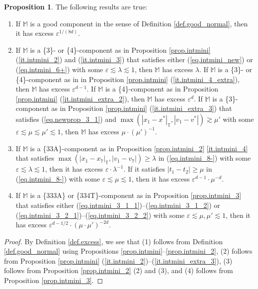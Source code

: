 \documentclass[10pt, reqno]{amsart}
\newcommand{\Mb}{\mathbb M}
\newcommand{\Tb}{\mathbb T}
\theoremstyle{definition}
\newtheorem{proposition}[theorem]{Proposition}
\theoremstyle{remark}
\numberwithin{equation}{section}
\begin{document}
\begin{proposition}
\label{prop.newprop_3} The following results are true:
\begin{enumerate}
\item\label{it.newprop_0} If $\Mb$ is a good component in the sense of Definition \ref{def.good_normal}, then it has excess $\varepsilon^{1/(8d)}$.
\item\label{it.newprop_1} If $\Mb$ is a \{3\}- or \{4\}-component as in Proposition \ref{prop.intmini} (\ref{it.intmini_2}) and (\ref{it.intmini_3}) that satisfies either (\ref{eq.intmini_new}) or (\ref{eq.intmini_6+}) with some $\varepsilon\lesssim\lambda\lesssim 1$, then $\Mb$ has excess $\lambda$. If $\Mb$ is a \{3\}- or \{4\}-component as in in Proposition \ref{prop.intmini} (\ref{it.intmini_4_extra}), then $\Mb$ has excess $\varepsilon^{d-1}$. If $\Mb$ is a \{4\}-component as in Proposition \ref{prop.intmini} (\ref{it.intmini_extra_2}), then $\Mb$ has excess $\varepsilon^{d}$. If $\Mb$ is a \{3\}-component as in Proposition \ref{prop.intmini} (\ref{it.intmini_extra_3}) that satisfies (\ref{eq.newprop_3_1}) and $\max(|x_1-x^*|_\Tb,|v_1-v^*|)\gtrsim\mu'$ with some $\varepsilon\lesssim\mu\lesssim\mu'\lesssim 1$, then $\Mb$ has excess $\mu\cdot(\mu')^{-1}$.
\item\label{it.newprop_2} If $\Mb$ is a \{33A\}-component as in Proposition \ref{prop.intmini_2} \ref{it.intmini_4} that satisfies $\max(|x_1-x_7|_\Tb,|v_1-v_7|)\geq \lambda$ in (\ref{eq.intmini_8-}) with some $\varepsilon\lesssim\lambda\lesssim 1$, then it has excess $\varepsilon\cdot\lambda^{-1}$. If it satisfies $|t_1-t_2|\geq\mu$ in (\ref{eq.intmini_8-}) with some $\varepsilon\lesssim\mu\lesssim 1$, then it has excess $\varepsilon^{d-1}\cdot\mu^{-d}$.
\item\label{it.newprop_3} If $\Mb$ is a \{333A\} or \{334T\}-component as in Proposition \ref{prop.intmini_3} that satisfies either (\ref{eq.intmini_3_1_1})--(\ref{eq.intmini_3_1_2}) or (\ref{eq.intmini_3_2_1})--(\ref{eq.intmini_3_2_2}) with some $\varepsilon\lesssim\mu,\mu'\lesssim 1$, then it has excess $\varepsilon^{d-1/2}\cdot (\mu\cdot\mu')^{-2d}$.
\end{enumerate}
\end{proposition}
\begin{proof} By Definition \ref{def.excess}, we see that (1) follows from Definition \ref{def.good_normal} using Propositions \ref{prop.intmini}--\ref{prop.intmini_2}, (2) follows from Proposition \ref{prop.intmini} (\ref{it.intmini_2})--(\ref{it.intmini_extra_3}), (3) follows from Proposition \ref{prop.intmini_2} (2) and (3), and (4) follows from Proposition \ref{prop.intmini_3}.
\end{proof}
\end{document}

